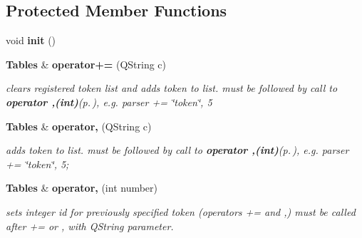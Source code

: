 \subsection*{Protected Member Functions}
\begin{CompactItemize}
\item 
void {\bf init} ()
\item 
{\bf Tables} \& {\bf operator+=} (QString c)
\begin{CompactList}\small\item\em clears registered token list and adds token to list. must be followed by call to {\bf operator ,(int)}{\rm (p.\,\pageref{classTables_b3})}, e.g. parser += \char`\"{}token\char`\"{}, 5 \item\end{CompactList}\item 
{\bf Tables} \& {\bf operator,} (QString c)
\begin{CompactList}\small\item\em adds token to list. must be followed by call to {\bf operator ,(int)}{\rm (p.\,\pageref{classTables_b3})}, e.g. parser += \char`\"{}token\char`\"{}, 5; \item\end{CompactList}\item 
{\bf Tables} \& {\bf operator,} (int number)
\begin{CompactList}\small\item\em sets integer id for previously specified token (operators += and ,) must be called after += or , with QString parameter. \item\end{CompactList}\end{CompactItemize}
